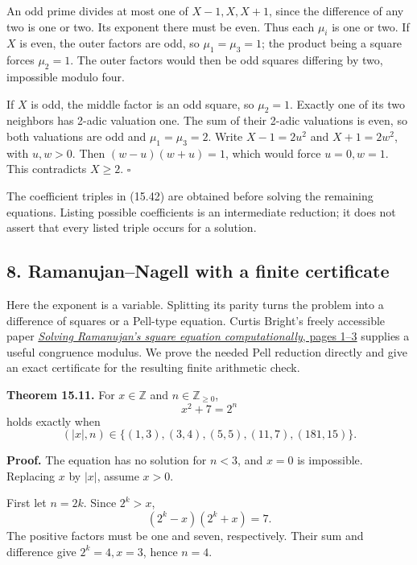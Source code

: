 \documentclass[
  11pt,
  a4paper,
]{article}
\begin{document}
An odd prime divides at most one of \(X-1,X,X+1\), since the difference
of any two is one or two. Its exponent there must be even. Thus each
\(\mu_i\) is one or two. If \(X\) is even, the outer factors are odd, so
\(\mu_1=\mu_3=1\); the product being a square forces \(\mu_2=1\). The
outer factors would then be odd squares differing by two, impossible
modulo four.

If \(X\) is odd, the middle factor is an odd square, so \(\mu_2=1\).
Exactly one of its two neighbors has 2-adic valuation one. The sum of
their 2-adic valuations is even, so both valuations are odd and
\(\mu_1=\mu_3=2\). Write \(X-1=2u^2\) and \(X+1=2w^2\), with \(u,w>0\).
Then \((w-u)(w+u)=1\), which would force \(u=0,w=1\). This contradicts
\(X\ge2\). \(\square\)

The coefficient triples in (15.42) are obtained before solving the
remaining equations. Listing possible coefficients is an intermediate
reduction; it does not assert that every listed triple occurs for a
solution.

\subsection{8. Ramanujan--Nagell with a finite
certificate}\label{ramanujannagell-with-a-finite-certificate}

Here the exponent is a variable. Splitting its parity turns the problem
into a difference of squares or a Pell-type equation. Curtis Bright's
freely accessible paper
\href{https://cs.uwaterloo.ca/~cbright/nsra/ramanujans-square-equation.pdf}{\emph{Solving
Ramanujan's square equation computationally}, pages 1--3} supplies a
useful congruence modulus. We prove the needed Pell reduction directly
and give an exact certificate for the resulting finite arithmetic check.

\textbf{Theorem 15.11.} For \(x\in\mathbb Z\) and
\(n\in\mathbb Z_{\ge0}\), \[
x^2+7=2^n
\tag{15.43}
\] holds exactly when \[
(|x|,n)\in\{(1,3),(3,4),(5,5),(11,7),(181,15)\}.
\tag{15.44}
\]

\textbf{Proof.} The equation has no solution for \(n<3\), and \(x=0\) is
impossible. Replacing \(x\) by \(|x|\), assume \(x>0\).

First let \(n=2k\). Since \(2^k>x\), \[
(2^k-x)(2^k+x)=7.
\tag{15.45}
\] The positive factors must be one and seven, respectively. Their sum
and difference give \(2^k=4,x=3\), hence \(n=4\).
\end{document}
